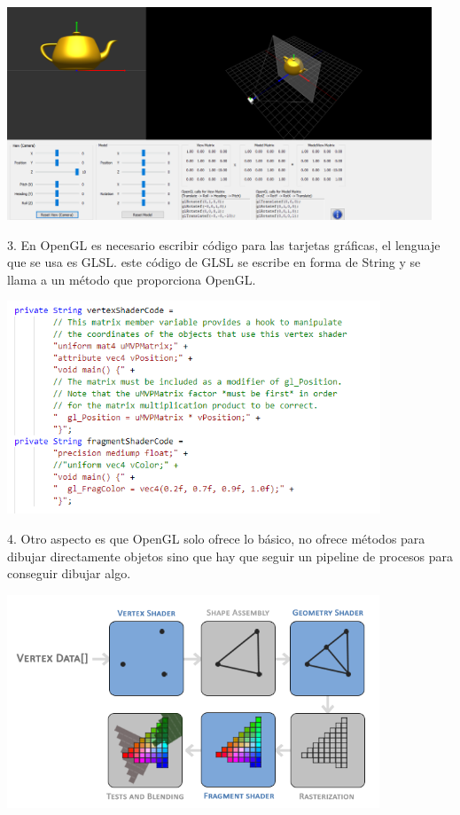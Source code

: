 \includegraphics[height=2.5in]{figures/teapot.png}

3. En OpenGL es necesario escribir código para las tarjetas gráficas, el lenguaje que se usa es GLSL.
este código de GLSL se escribe en forma de String y se llama a un método 
que proporciona OpenGL.

\includegraphics[height=2.5in]{figures/GLSL.png}

4. Otro aspecto es que OpenGL solo ofrece lo básico, no ofrece métodos para dibujar directamente objetos sino 
que hay que seguir un pipeline de procesos para conseguir dibujar algo.

\includegraphics[height=2.5in]{figures/pipeline.png}

